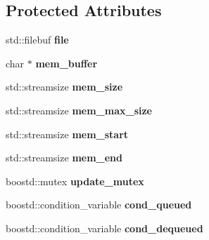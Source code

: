 \subsection*{Protected Attributes}
\begin{DoxyCompactItemize}
\item 
std\+::filebuf {\bfseries file}\hypertarget{classpangolin_1_1threadedfilebuf_a373fcf09776cc1868c4ff08c333c7c3c}{}\label{classpangolin_1_1threadedfilebuf_a373fcf09776cc1868c4ff08c333c7c3c}

\item 
char $\ast$ {\bfseries mem\+\_\+buffer}\hypertarget{classpangolin_1_1threadedfilebuf_aac3ce17357da2f6e81ebc77c5e998c71}{}\label{classpangolin_1_1threadedfilebuf_aac3ce17357da2f6e81ebc77c5e998c71}

\item 
std\+::streamsize {\bfseries mem\+\_\+size}\hypertarget{classpangolin_1_1threadedfilebuf_aba55337f4f0132177ad5c27ae968377b}{}\label{classpangolin_1_1threadedfilebuf_aba55337f4f0132177ad5c27ae968377b}

\item 
std\+::streamsize {\bfseries mem\+\_\+max\+\_\+size}\hypertarget{classpangolin_1_1threadedfilebuf_a4804e187ba87430eb131ff46f2d88fe6}{}\label{classpangolin_1_1threadedfilebuf_a4804e187ba87430eb131ff46f2d88fe6}

\item 
std\+::streamsize {\bfseries mem\+\_\+start}\hypertarget{classpangolin_1_1threadedfilebuf_aa17442e2f4d97662f0c88f8b17eac1fa}{}\label{classpangolin_1_1threadedfilebuf_aa17442e2f4d97662f0c88f8b17eac1fa}

\item 
std\+::streamsize {\bfseries mem\+\_\+end}\hypertarget{classpangolin_1_1threadedfilebuf_a7a0424da5568a7095dd194e26ecaf071}{}\label{classpangolin_1_1threadedfilebuf_a7a0424da5568a7095dd194e26ecaf071}

\item 
boostd\+::mutex {\bfseries update\+\_\+mutex}\hypertarget{classpangolin_1_1threadedfilebuf_ad333f1455ad1d081ba1a0d55a02c9945}{}\label{classpangolin_1_1threadedfilebuf_ad333f1455ad1d081ba1a0d55a02c9945}

\item 
boostd\+::condition\+\_\+variable {\bfseries cond\+\_\+queued}\hypertarget{classpangolin_1_1threadedfilebuf_aae1332b77e84426cd16ec85e43c611f6}{}\label{classpangolin_1_1threadedfilebuf_aae1332b77e84426cd16ec85e43c611f6}

\item 
boostd\+::condition\+\_\+variable {\bfseries cond\+\_\+dequeued}\hypertarget{classpangolin_1_1threadedfilebuf_a4cd70c2f2d254f271e42c19d852266b5}{}\label{classpangolin_1_1threadedfilebuf_a4cd70c2f2d254f271e42c19d852266b5}


\end{DoxyCompactItemize}
